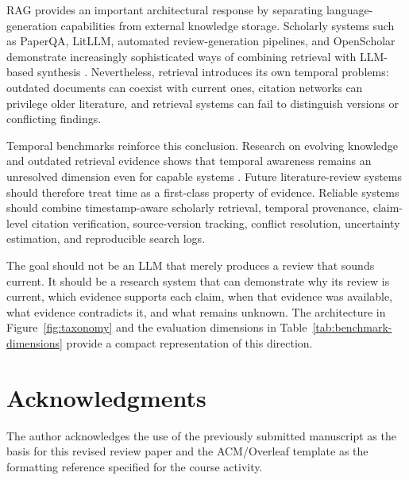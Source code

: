 \documentclass[manuscript,screen]{acmart}
\begin{document}
RAG provides an important architectural response by separating language-generation capabilities from external
knowledge storage. Scholarly systems such as PaperQA, LitLLM, automated review-generation pipelines, and
OpenScholar demonstrate increasingly sophisticated ways of combining retrieval with LLM-based synthesis
\cite{lala2023,agarwal2024,wu2025,asai2026}. Nevertheless, retrieval introduces its own temporal problems:
outdated documents can coexist with current ones, citation networks can privilege older literature, and
retrieval systems can fail to distinguish versions or conflicting findings.

Temporal benchmarks reinforce this conclusion. Research on evolving knowledge and outdated retrieval evidence
shows that temporal awareness remains an unresolved dimension even for capable systems
\cite{kim2024,zhu2025,ouyang2025}. Future literature-review systems should therefore treat time as a
first-class property of evidence. Reliable systems should combine timestamp-aware scholarly retrieval,
temporal provenance, claim-level citation verification, source-version tracking, conflict resolution,
uncertainty estimation, and reproducible search logs.

The goal should not be an LLM that merely produces a review that sounds current. It should be a research
system that can demonstrate why its review is current, which evidence supports each claim, when that evidence
was available, what evidence contradicts it, and what remains unknown. The architecture in Figure~\ref{fig:taxonomy}
and the evaluation dimensions in Table~\ref{tab:benchmark-dimensions} provide a compact representation of
this direction.

\section*{Acknowledgments}
The author acknowledges the use of the previously submitted manuscript as the basis for this revised review
paper and the ACM/Overleaf template as the formatting reference specified for the course activity.



\end{document}
